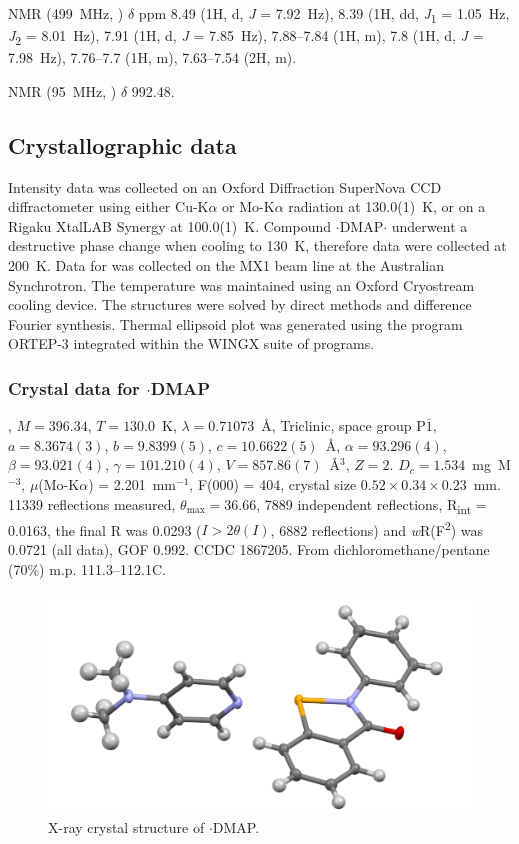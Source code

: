 \begin{refsection}
 NMR (499~MHz, ) $\delta$ ppm 8.49 (1H, d, \textit{J} = 7.92~Hz), 8.39 (1H, dd, \textit{J}\textsubscript{1} = 1.05~Hz, \textit{J}\textsubscript{2} = 8.01~Hz), 7.91 (1H, d, \textit{J} = 7.85~Hz), 7.88--7.84 (1H, m), 7.8 (1H, d, \textit{J} = 7.98~Hz), 7.76--7.7 (1H, m), 7.63--7.54 (2H, m).

 NMR (95~MHz, ) $ \delta $ 992.48.

\subsection{Crystallographic data}\label{sec:ch3-si}
Intensity data was collected on an Oxford Diffraction SuperNova CCD diffractometer using either Cu-K$\alpha$ or Mo-K$\alpha$ radiation at 130.0(1)~K, or on a Rigaku XtalLAB Synergy at 100.0(1)~K. Compound $ \cdot $DMAP$ \cdot $ underwent a destructive phase change when cooling to 130~K, therefore data were collected at 200~K. Data for  was collected on the MX1 beam line at the Australian Synchrotron\autocite{Cowieson2015}. The temperature was maintained using an Oxford Cryostream cooling device. The structures were solved by direct methods and difference Fourier synthesis.\autocite{Sheldrick2015} Thermal ellipsoid plot was generated using the program ORTEP-3\autocite{Farrugia1997} integrated within the WINGX\autocite{Farrugia1999} suite of programs.

\subsubsection{Crystal data for \texorpdfstring{$ \cdot $DMAP}{C20H19N3OSe}}
, $M=396.34$, $T=130.0$~K, $ \lambda=0.71073 $~\AA, Triclinic, space group P$\bar{1}$, $a = 8.3674(3)$, $b = 9.8399(5)$, $c =10.6622(5)$~\AA, $\alpha=93.296(4)$\degree, $\beta=93.021(4)$\degree, $\gamma=101.210(4)$\degree, $V=857.86(7)$~\AA$^{3}$, $Z = 2$.
$D_{c}= 1.534$~mg~M$^{-3}$, $\mu$(Mo-K$\alpha$) = 2.201~mm$^{-1}$, F(000) = 404, crystal size $0.52 \times 0.34 \times 0.23$~mm.
11339 reflections measured, $\theta_{\max}=36.66$\degree, 7889 independent reflections, R\textsubscript{int} = 0.0163, the final R was 0.0293 ($I > 2\theta(I)$, 6882 reflections) and \textit{w}R(F\textsuperscript{2}) was 0.0721 (all data), GOF 0.992.
CCDC 1867205.
From dichloromethane/pentane (70\%) m.p. 111.3--112.1\degree{}C.

\begin{figure}
  \includegraphics[width=0.6\linewidth]{Figures/ebs-dmap-xtal.pdf}
  \caption{X-ray crystal structure of \texorpdfstring{$ \cdot $DMAP}{C20H19N3OSe}.}
\end{figure}


\end{refsection}
